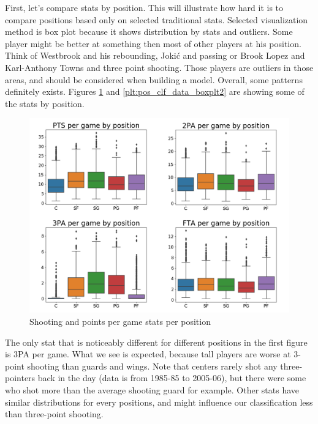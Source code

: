 \documentclass[a4paper]{article}
\begin{document}
First, let's compare stats by position. This will illustrate how hard it is to compare positions based only on selected traditional stats. Selected visualization method is box plot \cite{boxplots} because it shows distribution by stats and outliers. Some player might be better at something then most of other players at his position. Think of Westbrook and his rebounding, Jokić and passing or Brook Lopez and Karl-Anthony Towns and three point shooting. Those players are outliers in those areas, and should be considered when building a model. Overall, some patterns definitely exists. Figures \ref{plt:pos_clf_data_boxplt1} and \ref{plt:pos_clf_data_boxplt2} are showing some of the stats by position.

\begin{figure}[h!]
\begin{center}
\includegraphics[width=1\textwidth]{per_pos_pts_shooting.png}
\end{center}
\caption{Shooting and points per game stats per position}
\label{plt:pos_clf_data_boxplt1}
\end{figure}

The only stat that is noticeably different for different positions in the first figure is 3PA per game. What we see is expected, because tall players are worse at 3-point shooting than guards and wings. Note that centers rarely shot any three-pointers back in the day (data is from 1985-85 to 2005-06), but there were some who shot more than the average shooting guard for example. Other stats have similar distributions for every positions, and might influence our classification less than three-point shooting.
\end{document}
